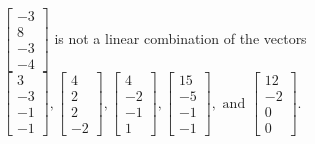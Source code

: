 \begin{exercise}
\begin{exerciseStatement}
  \end{exerciseStatement}
  \begin{exerciseAnswer}
   \(\left[\begin{array}{c}
-3 \\
8 \\
-3 \\
-4
\end{array}\right]\) 
  	 is not  
	a linear combination of the vectors \(\left[\begin{array}{c}
3 \\
-3 \\
-1 \\
-1
\end{array}\right] , \left[\begin{array}{c}
4 \\
2 \\
2 \\
-2
\end{array}\right] , \left[\begin{array}{c}
4 \\
-2 \\
-1 \\
1
\end{array}\right] , \left[\begin{array}{c}
15 \\
-5 \\
-1 \\
-1
\end{array}\right] , \text{ and } \left[\begin{array}{c}
12 \\
-2 \\
0 \\
0
\end{array}\right]\).

	
  


  \end{exerciseAnswer}
\end{exercise}